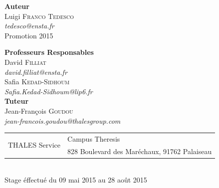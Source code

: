 \begin{titlepage}
\begin{center}
		\begin{minipage}{0.4\textwidth}
			\begin{flushleft} \large
				\textbf{Auteur}\\
				Luigi \textsc{Franco Tedesco}\\
				      \textit{tedesco@ensta.fr}\\
				Promotion 2015
			\end{flushleft}
		\end{minipage}
		\begin{minipage}{0.55\textwidth}
			\begin{flushright} \large
				\textbf{Professeurs Responsables} \\
				David \textsc{Filliat} \\
				\textit{david.filliat@ensta.fr}\\[0.1cm]
				Safia \textsc{Kedad-Sidhoum} \\
				\textit{Safia.Kedad-Sidhoum@lip6.fr}\\[0.1cm]
				\textbf{Tuteur} \\
				Jean-François \textsc{Goudou} \\
				\textit{jean-francois.goudou@thalesgroup.com}\\
			\end{flushright}
		\end{minipage}

		\vfill

		\begin{tabular}{r|l}
			\multirow{2}{*}{THALES Service}& Campus Theresis\\
			       & 828 Boulevard des Maréchaux, 91762 Palaiseau 
		\end{tabular}\\[1cm]
		Stage éffectué du 09 mai 2015 au 28 août 2015\\[0.2cm]
	\end{center}

\end{titlepage}


